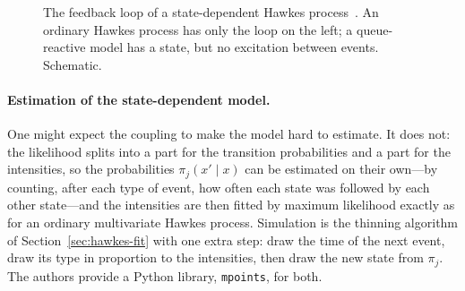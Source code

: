 \begin{figure}[!htbp]
\centering
{}
\caption{The feedback loop of a state-dependent Hawkes process~\citep{morariupatrichi2022}. An ordinary Hawkes
process has only the loop on the left; a queue-reactive model has a state, but no excitation between events.
Schematic.}
\label{fig:sdh-loop}
\end{figure}

\paragraph{Estimation of the state-dependent model.} One might expect the coupling to make the model hard to estimate. It does
not: the likelihood splits into a part for the transition probabilities and a part for the intensities, so the
probabilities $\pi_j(x'\mid x)$ can be estimated on their own---by counting, after each type of event, how often
each state was followed by each other state---and the intensities are then fitted by maximum likelihood exactly
as for an ordinary multivariate Hawkes process. Simulation is the thinning algorithm of
Section~\ref{sec:hawkes-fit} with one extra step: draw the time of the next event, draw its type in proportion to
the intensities, then draw the new state from $\pi_j$. The authors provide a Python library, \texttt{mpoints}, for
both.

